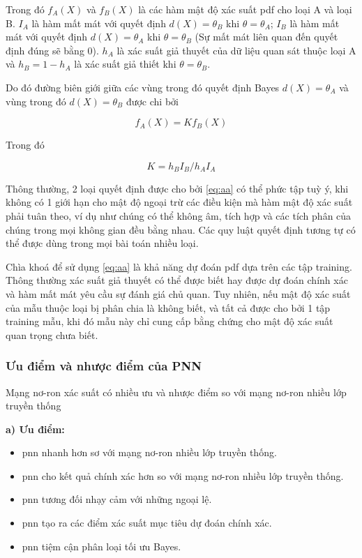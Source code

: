 Trong đó $f_A (X)$ và $f_B (X)$ là các hàm mật độ xác suất \ac{pdf} cho loại A và loại B. $I_A$ là hàm mất mát với quyết định $d(X) = \theta_B$ khi $\theta = \theta_A$; $I_B$ là hàm mất mát với quyết định $d(X)= \theta_A$ khi $\theta = \theta_B$ (Sự mất mát liên quan đến quyết định đúng sẽ bằng 0). $h_A$ là xác suất giả thuyết của dữ liệu quan sát thuộc loại A và $h_B=1-h_A$ là xác suất giả thiết khi $\theta = \theta_B$.

\vspace{\baselineskip}
Do đó đường biên giới giữa các vùng trong đó quyết định Bayes $d(X) = \theta_A$ và vùng trong đó $d(X) = \theta_B$ được chi bởi 

\begin{equation}
	f_A(X) = Kf_B(X)
	\label{eq:aa}
\end{equation}

Trong đó

\begin{equation}
	K=h_BI_B / h_AI_A
\end{equation}

Thông thường, 2 loại quyết định được cho bởi \eqref{eq:aa} có thể phức tập tuỳ ý, khi không có 1 giới hạn cho mật độ ngoại trừ các điều kiện mà hàm mật độ xác suất phải tuân theo, ví dụ như chúng có thể không âm, tích hợp và các tích phân của chúng trong mọi không gian đều bằng nhau. Các quy luật quyết định tương tự có thể được dùng trong mọi bài toán nhiều loại.

\vspace{\baselineskip}
Chìa khoá để sử dụng \eqref{eq:aa} là khả năng dự đoán \ac{pdf} dựa trên các tập training. Thông thường xác suất giả thuyết có thể được biết hay được dự đoán chính xác và hàm mất mát yêu cầu sự đánh giá chủ quan. Tuy nhiên, nếu mật độ xác suất của mẫu thuộc loại bị phân chia là không biết, và tất cả được cho bởi 1 tập training mẫu, khi đó mẫu này chỉ cung cấp bằng chứng cho mật độ xác suất quan trọng chưa biết.
	
	


\subsubsection{Ưu điểm và nhược điểm của PNN}
Mạng nơ-ron xác suất có nhiều ưu và nhược điểm so với mạng nơ-ron nhiều lớp truyền thống

\vspace{\baselineskip}
\textbf{a) Ưu điểm:}

\begin{itemize}
	\item \ac{pnn} nhanh hơn sơ với mạng nơ-ron nhiều lớp truyền thống.
	\item \ac{pnn} cho kết quả chính xác hơn so với mạng nơ-ron nhiều lớp truyền thống.
	\item \ac{pnn} tương đối nhạy cảm với những ngoại lệ.
	\item \ac{pnn} tạo ra các điểm xác suất mục tiêu dự đoán chính xác.
	\item \ac{pnn} tiệm cận phân loại tối ưu Bayes.
\end{itemize}

